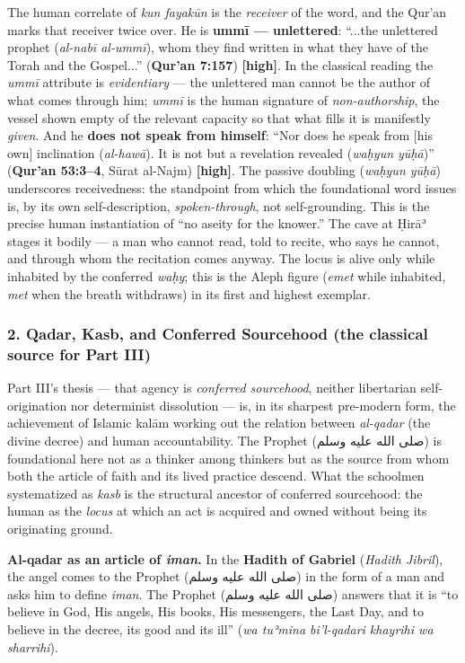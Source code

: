 \documentclass[11pt]{article}
\newcommand{\AR}[1]{{\arabicfont\beginR #1\endR}}
\begin{document}
The human correlate of \emph{kun fayakūn} is the \emph{receiver} of the word, and the Qur'an marks that receiver twice over. He is \textbf{ummī — unlettered}: ``...the unlettered prophet (\emph{al-nabī al-ummī}), whom they find written in what they have of the Torah and the Gospel...'' (\textbf{Qur'an 7:157}) \textbf{[high]}. In the classical reading the \emph{ummī} attribute is \emph{evidentiary} — the unlettered man cannot be the author of what comes through him; \emph{ummī} is the human signature of \emph{non-authorship}, the vessel shown empty of the relevant capacity so that what fills it is manifestly \emph{given}. And he \textbf{does not speak from himself}: ``Nor does he speak from [his own] inclination (\emph{al-hawā}). It is not but a revelation revealed (\emph{waḥyun yūḥā})'' (\textbf{Qur'an 53:3–4}, Sūrat al-Najm) \textbf{[high]}. The passive doubling (\emph{waḥyun yūḥā}) underscores receivedness: the standpoint from which the foundational word issues is, by its own self-description, \emph{spoken-through}, not self-grounding. This is the precise human instantiation of ``no aseity for the knower.'' The cave at Ḥirāʾ stages it bodily — a man who cannot read, told to recite, who says he cannot, and through whom the recitation comes anyway. The locus is alive only while inhabited by the conferred \emph{waḥy}; this is the Aleph figure (\emph{emet} while inhabited, \emph{met} when the breath withdraws) in its first and highest exemplar.

\subsubsection*{2. Qadar, Kasb, and Conferred Sourcehood (the classical source for Part III)}

Part III's thesis — that agency is \emph{conferred sourcehood}, neither libertarian self-origination nor determinist dissolution — is, in its sharpest pre-modern form, the achievement of Islamic kalām working out the relation between \emph{al-qadar} (the divine decree) and human accountability. The Prophet (\AR{صلى الله عليه وسلم}) is foundational here not as a thinker among thinkers but as the source from whom both the article of faith and its lived practice descend. What the schoolmen systematized as \emph{kasb} is the structural ancestor of conferred sourcehood: the human as the \emph{locus} at which an act is acquired and owned without being its originating ground.

\textbf{Al-qadar as an article of \emph{iman}.} In the \textbf{Hadith of Gabriel} (\emph{Hadith Jibril}), the angel comes to the Prophet (\AR{صلى الله عليه وسلم}) in the form of a man and asks him to define \emph{iman}. The Prophet (\AR{صلى الله عليه وسلم}) answers that it is ``to believe in God, His angels, His books, His messengers, the Last Day, and to believe in the decree, its good and its ill'' (\emph{wa tuʾmina bi'l-qadari khayrihi wa sharrihi}).
\end{document}
